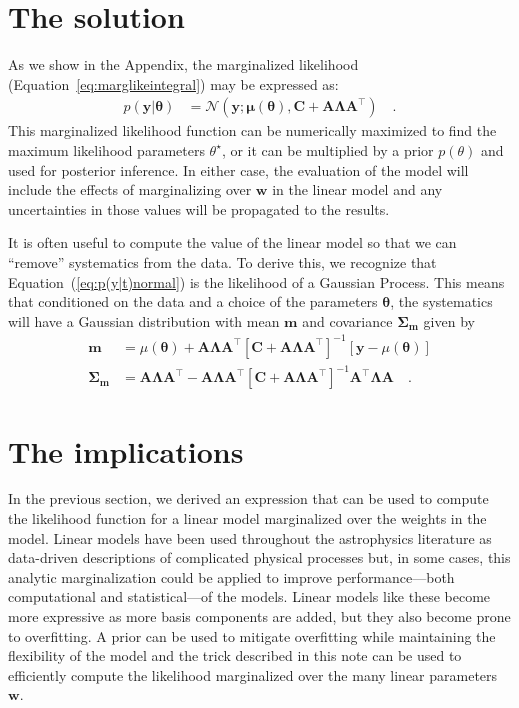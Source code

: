 \documentclass[modern]{rnaastex}
\renewcommand{\eqref}[1]{\ref{eq:#1}}
\newcommand{\Eq}[1]{Equation~(\eqref{#1})}
\newcommand{\eq}[1]{\Eq{#1}}
\newcommand{\eqalt}[1]{Equation~\eqref{#1}}
\newcommand{\eqlabel}[1]{\label{eq:#1}}
\newcommand{\bvec}[1]{{\ensuremath{\boldsymbol{#1}}}}
\newcommand{\Normal}{\ensuremath{\mathcal{N}}}
\newcommand{\mA}{\ensuremath{\bvec{A}}}
\newcommand{\mC}{\ensuremath{\bvec{C}}}
\newcommand{\mL}{\ensuremath{\bvec{\Lambda}}}
\newcommand{\vy}{\ensuremath{\bvec{y}}}
\newcommand{\vt}{\ensuremath{\bvec{\theta}}}
\newcommand{\vm}{\ensuremath{\bvec{\mu}(\bvec{\theta})}}
\begin{document}
\section{The solution}

As we show in the Appendix, the marginalized likelihood 
(\eqalt{marglikeintegral}) may be expressed as:
%
\begin{align}
\eqlabel{p(y|t)normal}
p(\vy | \vt) &= \Normal (\vy; \vm, \mC + \mA \mL \mA^\top) \quad.
\end{align}
%
This marginalized likelihood function can be numerically maximized to find the
maximum likelihood parameters $\theta^\star$, or it can be
multiplied by a prior $p(\theta)$ and used for posterior inference.
In either case, the evaluation of the model will include the effects of
marginalizing over $\bvec{w}$ in the linear model and any uncertainties in
those values will be propagated to the results.

It is often useful to compute the value of the linear model so that we can
``remove'' systematics from the data.
To derive this, we recognize that \eq{p(y|t)normal} is the likelihood of a
Gaussian Process.
This means that conditioned on the data and a choice of the parameters
$\bvec{\theta}$, the systematics will have a Gaussian distribution with mean
$\bvec{m}$ and covariance $\bvec{\Sigma}_\bvec{m}$ given by
\citep{Rasmussen:2006}
%
\begin{align}\eqlabel{pred}
\bvec{m} &= \mu(\bvec{\theta}) + \mA \mL \mA^\top  \left[\mC +
    \mA \mL \mA^\top\right]^{-1} \left[\bvec{y} - \mu(\bvec{\theta})\right]
    \nonumber\\
\bvec{\Sigma}_\bvec{m} &= \mA \mL \mA^\top - \mA \mL \mA^\top
    \left[\mC + \mA \mL \mA^\top\right]^{-1}
    \mA^\top \mL \mA \quad.
\end{align}

\section{The implications}

In the previous section, we derived an expression that can be used to compute
the likelihood function for a linear model marginalized over the weights in
the model.
Linear models have been used throughout the astrophysics literature as
data-driven descriptions of complicated physical processes but, in some cases,
this analytic marginalization could be applied to improve performance---both
computational and statistical---of the models.
Linear models like these become more expressive as more basis components are
added, but they also become prone to overfitting.
A prior can be used to mitigate overfitting while maintaining the flexibility
of the model and the trick described in this note can be used to efficiently
compute the likelihood marginalized over the many linear parameters $\bvec{w}$.
\end{document}
